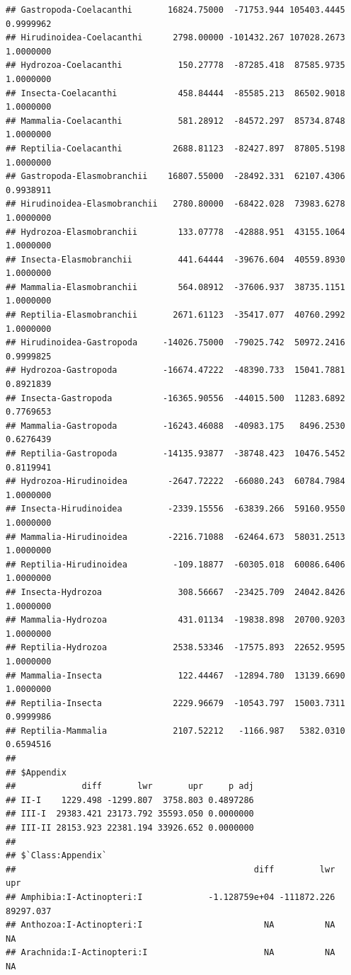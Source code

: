 \documentclass[
  12pt,
]{article}
\begin{document}
\begin{verbatim}
## Gastropoda-Coelacanthi       16824.75000  -71753.944 105403.4445 0.9999962
## Hirudinoidea-Coelacanthi      2798.00000 -101432.267 107028.2673 1.0000000
## Hydrozoa-Coelacanthi           150.27778  -87285.418  87585.9735 1.0000000
## Insecta-Coelacanthi            458.84444  -85585.213  86502.9018 1.0000000
## Mammalia-Coelacanthi           581.28912  -84572.297  85734.8748 1.0000000
## Reptilia-Coelacanthi          2688.81123  -82427.897  87805.5198 1.0000000
## Gastropoda-Elasmobranchii    16807.55000  -28492.331  62107.4306 0.9938911
## Hirudinoidea-Elasmobranchii   2780.80000  -68422.028  73983.6278 1.0000000
## Hydrozoa-Elasmobranchii        133.07778  -42888.951  43155.1064 1.0000000
## Insecta-Elasmobranchii         441.64444  -39676.604  40559.8930 1.0000000
## Mammalia-Elasmobranchii        564.08912  -37606.937  38735.1151 1.0000000
## Reptilia-Elasmobranchii       2671.61123  -35417.077  40760.2992 1.0000000
## Hirudinoidea-Gastropoda     -14026.75000  -79025.742  50972.2416 0.9999825
## Hydrozoa-Gastropoda         -16674.47222  -48390.733  15041.7881 0.8921839
## Insecta-Gastropoda          -16365.90556  -44015.500  11283.6892 0.7769653
## Mammalia-Gastropoda         -16243.46088  -40983.175   8496.2530 0.6276439
## Reptilia-Gastropoda         -14135.93877  -38748.423  10476.5452 0.8119941
## Hydrozoa-Hirudinoidea        -2647.72222  -66080.243  60784.7984 1.0000000
## Insecta-Hirudinoidea         -2339.15556  -63839.266  59160.9550 1.0000000
## Mammalia-Hirudinoidea        -2216.71088  -62464.673  58031.2513 1.0000000
## Reptilia-Hirudinoidea         -109.18877  -60305.018  60086.6406 1.0000000
## Insecta-Hydrozoa               308.56667  -23425.709  24042.8426 1.0000000
## Mammalia-Hydrozoa              431.01134  -19838.898  20700.9203 1.0000000
## Reptilia-Hydrozoa             2538.53346  -17575.893  22652.9595 1.0000000
## Mammalia-Insecta               122.44467  -12894.780  13139.6690 1.0000000
## Reptilia-Insecta              2229.96679  -10543.797  15003.7311 0.9999986
## Reptilia-Mammalia             2107.52212   -1166.987   5382.0310 0.6594516
## 
## $Appendix
##             diff       lwr       upr     p adj
## II-I    1229.498 -1299.807  3758.803 0.4897286
## III-I  29383.421 23173.792 35593.050 0.0000000
## III-II 28153.923 22381.194 33926.652 0.0000000
## 
## $`Class:Appendix`
##                                               diff         lwr         upr
## Amphibia:I-Actinopteri:I             -1.128759e+04 -111872.226   89297.037
## Anthozoa:I-Actinopteri:I                        NA          NA          NA
## Arachnida:I-Actinopteri:I                       NA          NA          NA

\end{verbatim}
\end{document}

